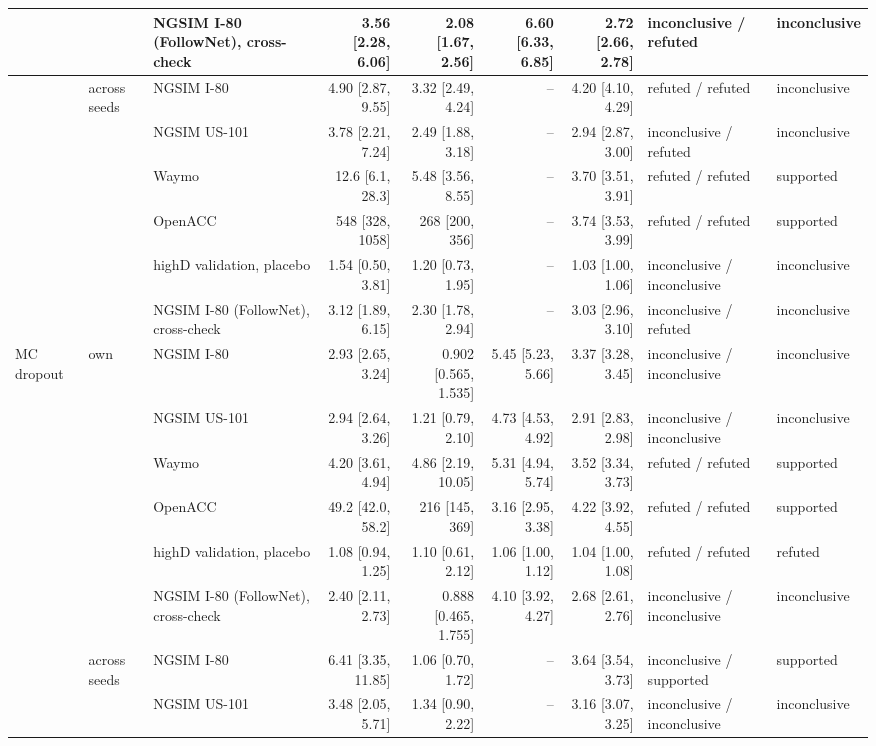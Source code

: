 \begin{longtable}{lllrrrrll}
 &  & NGSIM I-80 (FollowNet), cross-check & 3.56 [2.28, 6.06] & 2.08 [1.67, 2.56] & 6.60 [6.33, 6.85] & 2.72 [2.66, 2.78] & inconclusive / refuted & inconclusive \\
\midrule
 & across seeds & NGSIM I-80 & 4.90 [2.87, 9.55] & 3.32 [2.49, 4.24] & -- & 4.20 [4.10, 4.29] & refuted / refuted & inconclusive \\
 &  & NGSIM US-101 & 3.78 [2.21, 7.24] & 2.49 [1.88, 3.18] & -- & 2.94 [2.87, 3.00] & inconclusive / refuted & inconclusive \\
 &  & Waymo & 12.6 [6.1, 28.3] & 5.48 [3.56, 8.55] & -- & 3.70 [3.51, 3.91] & refuted / refuted & supported \\
 &  & OpenACC & 548 [328, 1058] & 268 [200, 356] & -- & 3.74 [3.53, 3.99] & refuted / refuted & supported \\
 &  & highD validation, placebo & 1.54 [0.50, 3.81] & 1.20 [0.73, 1.95] & -- & 1.03 [1.00, 1.06] & inconclusive / inconclusive & inconclusive \\
 &  & NGSIM I-80 (FollowNet), cross-check & 3.12 [1.89, 6.15] & 2.30 [1.78, 2.94] & -- & 3.03 [2.96, 3.10] & inconclusive / refuted & inconclusive \\
\midrule
MC dropout & own & NGSIM I-80 & 2.93 [2.65, 3.24] & 0.902 [0.565, 1.535] & 5.45 [5.23, 5.66] & 3.37 [3.28, 3.45] & inconclusive / inconclusive & inconclusive \\
 &  & NGSIM US-101 & 2.94 [2.64, 3.26] & 1.21 [0.79, 2.10] & 4.73 [4.53, 4.92] & 2.91 [2.83, 2.98] & inconclusive / inconclusive & inconclusive \\
 &  & Waymo & 4.20 [3.61, 4.94] & 4.86 [2.19, 10.05] & 5.31 [4.94, 5.74] & 3.52 [3.34, 3.73] & refuted / refuted & supported \\
 &  & OpenACC & 49.2 [42.0, 58.2] & 216 [145, 369] & 3.16 [2.95, 3.38] & 4.22 [3.92, 4.55] & refuted / refuted & supported \\
 &  & highD validation, placebo & 1.08 [0.94, 1.25] & 1.10 [0.61, 2.12] & 1.06 [1.00, 1.12] & 1.04 [1.00, 1.08] & refuted / refuted & refuted \\
 &  & NGSIM I-80 (FollowNet), cross-check & 2.40 [2.11, 2.73] & 0.888 [0.465, 1.755] & 4.10 [3.92, 4.27] & 2.68 [2.61, 2.76] & inconclusive / inconclusive & inconclusive \\
\midrule
 & across seeds & NGSIM I-80 & 6.41 [3.35, 11.85] & 1.06 [0.70, 1.72] & -- & 3.64 [3.54, 3.73] & inconclusive / supported & supported \\
 &  & NGSIM US-101 & 3.48 [2.05, 5.71] & 1.34 [0.90, 2.22] & -- & 3.16 [3.07, 3.25] & inconclusive / inconclusive & inconclusive \\

\end{longtable}
